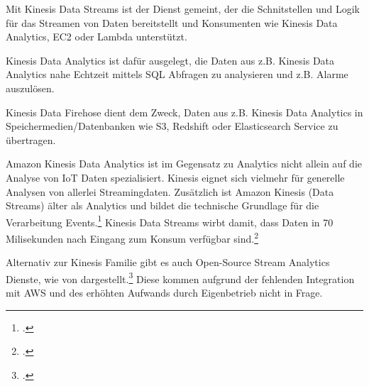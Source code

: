 Mit Kinesis Data Streams ist der Dienst gemeint, der die Schnitstellen und Logik für das Streamen von Daten bereitstellt und Konsumenten wie Kinesis Data Analytics, \ac{EC2} oder Lambda unterstützt. 

Kinesis Data Analytics ist dafür ausgelegt, die Daten aus z.B. Kinesis Data Analytics nahe Echtzeit mittels \ac{SQL} Abfragen zu analysieren und z.B. Alarme auszulösen.

Kinesis Data Firehose dient dem Zweck, Daten aus z.B. Kinesis Data Analytics in Speichermedien/Datenbanken wie \ac{S3}, Redshift oder Elasticsearch Service zu übertragen.

Amazon Kinesis Data Analytics ist im Gegensatz zu \AWSIOT{} Analytics nicht allein auf die Analyse von \ac{IoT} Daten spezialisiert. Kinesis eignet sich vielmehr für generelle Analysen von allerlei Streamingdaten. Zusätzlich ist Amazon Kinesis (Data Streams) älter als \AWSIOT{} Analytics und bildet die technische Grundlage für die Verarbeitung \AWSIOT{} Events.\footcite[Vgl.][]{Pogosova.28.05.2020} Kinesis Data Streams wirbt damit, dass Daten in 70 Milisekunden nach Eingang zum Konsum verfügbar sind.\footcite[Vgl.][]{AmazonWebServicesInc..o.J.af}

Alternativ zur Kinesis Familie gibt es auch Open-Source Stream Analytics Dienste, wie von \citeauthor{Singh.2016} dargestellt.\footcite[Vgl.][]{Singh.2016} Diese kommen aufgrund der fehlenden Integration mit \ac{AWS} und des erhöhten Aufwands durch Eigenbetrieb nicht in Frage.

